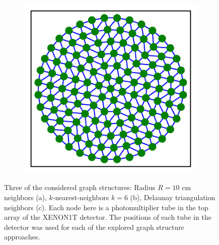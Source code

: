 \begin{figure}[t]
\begin{subfigure}{0.32\textwidth}
		\caption{}
	\end{subfigure}
	\begin{subfigure}{0.32\textwidth}
		\includegraphics[width=\textwidth]{figures/1T_delaunay-graph.pdf}
		\caption{}
	\end{subfigure}
	\caption{
	Three of the considered graph structures: Radius $R=10$ cm neighbors (a), $k$-nearest-neighbors $k=6$ (b), Delaunay triangulation neighbors (c).
	Each node here is a photomultiplier tube in the top array of the XENON1T detector.
	The positions of each tube in the detector was used for each of the explored graph structure approaches.
	}
	\label{fig:graph_structs}
\end{figure}
